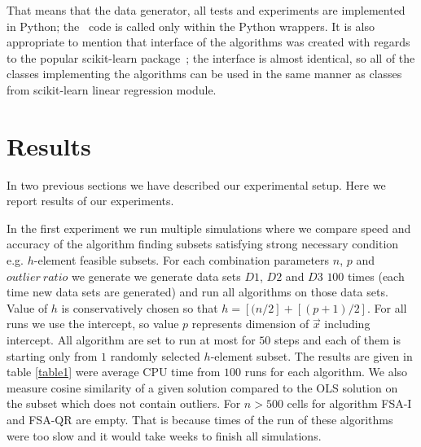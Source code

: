 That means that the data generator, all tests and experiments are implemented in Python; the \CC \  code is called only within the Python wrappers. It is also appropriate to mention that interface of the algorithms was created with regards to the popular scikit-learn package~\cite{scikit-learn}; the interface is almost identical, so all of the classes implementing the algorithms can be used in the same manner as classes from scikit-learn linear regression module.


\section{Results}
In two previous sections we have described our experimental setup. Here we report results of our experiments.

In the first experiment we run multiple simulations where we compare speed and accuracy of the algorithm finding subsets satisfying strong necessary condition e.g. $h$-element feasible subsets. For each combination parameters $n$, $p$ and $outlier~ratio$ we generate we generate data sets  $D1$, $D2$ and $D3$ $100$ times (each time new data sets are generated) and run all algorithms on those data sets. Value of $h$ is conservatively chosen so that $h = [(n/2] + [(p+1)/2]$. For all runs we use the intercept, so value $p$ represents dimension of $\vec{x}$ including intercept. All algorithm are set to run at most for $50$ steps and each of them is starting only from $1$ randomly selected $h$-element subset.  The results are given in table \ref{table1} were average CPU time from $100$ runs for each algorithm. We also measure cosine similarity of a given solution compared to the OLS solution on the subset which does not contain outliers. For $n > 500$ cells for algorithm FSA-I and FSA-QR are empty. That is because times of the run of these algorithms were too slow and it would take weeks to finish all simulations.





